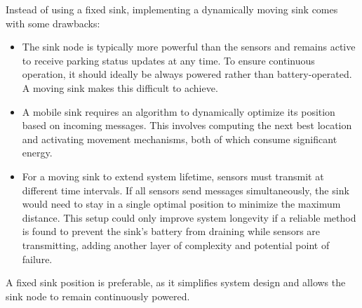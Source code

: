 \documentclass{Configuration_Files/PoliMi3i_thesis}
\begin{document}
Instead of using a fixed sink, implementing a dynamically moving sink comes with some drawbacks:
\begin{itemize}
    \item The sink node is typically more powerful than the sensors and remains active to receive parking status updates at any time. To ensure continuous operation, it should ideally be always powered rather than battery-operated. A moving sink makes this difficult to achieve.
    \item A mobile sink requires an algorithm to dynamically optimize its position based on incoming messages. This involves computing the next best location and activating movement mechanisms, both of which consume significant energy.
    \item For a moving sink to extend system lifetime, sensors must transmit at different time intervals. If all sensors send messages simultaneously, the sink would need to stay in a single optimal position to minimize the maximum distance. This setup could only improve system longevity if a reliable method is found to prevent the sink's battery from draining while sensors are transmitting, adding another layer of complexity and potential point of failure.
\end{itemize}

A fixed sink position is preferable, as it simplifies system design and allows the sink node to remain continuously powered.
\cleardoublepage
\end{document}
